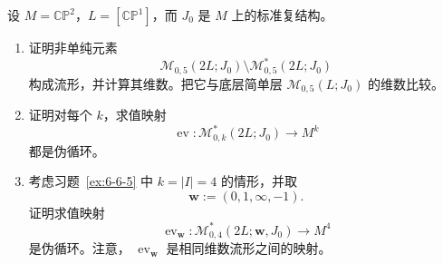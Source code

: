 \begin{exercise}\label{ex:6-6-6}
设 $M=\mathbb{CP}^2$，$L=[\mathbb{CP}^1]$，而 $J_0$ 是 $M$ 上的标准复结构。
\begin{enumerate}[label=(\roman*),leftmargin=3em]
\item 证明非单纯元素
\[
  \mathcal M_{0,5}(2L;J_0)\setminus
  \mathcal M^*_{0,5}(2L;J_0)
\]
构成流形，并计算其维数。把它与底层简单层
$\mathcal M_{0,5}(L;J_0)$ 的维数比较。
\item 证明对每个 $k$，求值映射
\[
  \operatorname{ev}:\mathcal M^*_{0,k}(2L;J_0)\longrightarrow M^k
\]
都是伪循环。
\item 考虑习题~\ref{ex:6-6-5} 中 $k=|I|=4$ 的情形，并取
\[
  \mathbf w:=(0,1,\infty,-1).
\]
证明求值映射
\[
  \operatorname{ev}_{\mathbf w}:
  \mathcal M^*_{0,4}(2L;\mathbf w,J_0)
  \longrightarrow M^4
\]
是伪循环。注意，
$\operatorname{ev}_{\mathbf w}$ 是相同维数流形之间的映射。
\end{enumerate}
\end{exercise}
